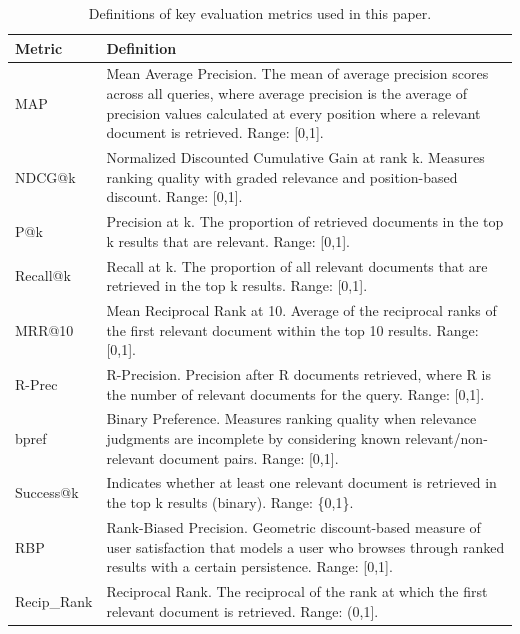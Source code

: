 \begin{table}[t]
\centering
\caption{Definitions of key evaluation metrics used in this paper.}
\label{tab:metric_definitions}
\footnotesize
\begin{tabularx}{\textwidth}{lX}
\toprule
\textbf{Metric} & \textbf{Definition} \\
\midrule
MAP & Mean Average Precision. The mean of average precision scores across all queries, where average precision is the average of precision values calculated at every position where a relevant document is retrieved. Range: [0,1]. \\
NDCG@k & Normalized Discounted Cumulative Gain at rank k. Measures ranking quality with graded relevance and position-based discount. Range: [0,1]. \\
P@k & Precision at k. The proportion of retrieved documents in the top k results that are relevant. Range: [0,1]. \\
Recall@k & Recall at k. The proportion of all relevant documents that are retrieved in the top k results. Range: [0,1]. \\
MRR@10 & Mean Reciprocal Rank at 10. Average of the reciprocal ranks of the first relevant document within the top 10 results. Range: [0,1]. \\
R-Prec & R-Precision. Precision after R documents retrieved, where R is the number of relevant documents for the query. Range: [0,1]. \\
bpref & Binary Preference. Measures ranking quality when relevance judgments are incomplete by considering known relevant/non-relevant document pairs. Range: [0,1]. \\
Success@k & Indicates whether at least one relevant document is retrieved in the top k results (binary). Range: \{0,1\}. \\
RBP & Rank-Biased Precision. Geometric discount-based measure of user satisfaction that models a user who browses through ranked results with a certain persistence. Range: [0,1]. \\
Recip\_Rank & Reciprocal Rank. The reciprocal of the rank at which the first relevant document is retrieved. Range: (0,1]. \\
\bottomrule
\end{tabularx}
\end{table}